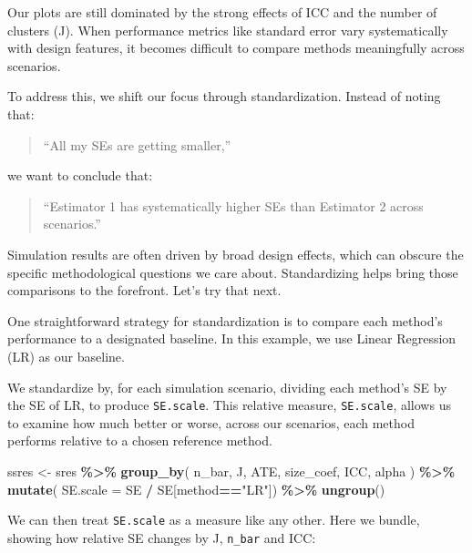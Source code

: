 \documentclass[
]{book}
\newenvironment{Shaded}{\begin{snugshade}}{\end{snugshade}}
\newcommand{\AttributeTok}[1]{\textcolor[rgb]{0.13,0.29,0.53}{#1}}
\newcommand{\FunctionTok}[1]{\textcolor[rgb]{0.13,0.29,0.53}{\textbf{#1}}}
\newcommand{\NormalTok}[1]{#1}
\newcommand{\OtherTok}[1]{\textcolor[rgb]{0.56,0.35,0.01}{#1}}
\newcommand{\SpecialCharTok}[1]{\textcolor[rgb]{0.81,0.36,0.00}{\textbf{#1}}}
\newcommand{\StringTok}[1]{\textcolor[rgb]{0.31,0.60,0.02}{#1}}
\begin{document}
Our plots are still dominated by the strong effects of ICC and the number of clusters (J). When performance metrics like standard error vary systematically with design features, it becomes difficult to compare methods meaningfully across scenarios.

To address this, we shift our focus through standardization. Instead of noting that:

\begin{quote}
``All my SEs are getting smaller,''
\end{quote}

we want to conclude that:

\begin{quote}
``Estimator 1 has systematically higher SEs than Estimator 2 across scenarios.''
\end{quote}

Simulation results are often driven by broad design effects, which can obscure the specific methodological questions we care about. Standardizing helps bring those comparisons to the forefront.
Let's try that next.

One straightforward strategy for standardization is to compare each method's performance to a designated baseline. In this example, we use Linear Regression (LR) as our baseline.

We standardize by, for each simulation scenario, dividing each method's SE by the SE of LR, to produce \texttt{SE.scale}.
This relative measure, \texttt{SE.scale}, allows us to examine how much better or worse, across our scenarios, each method performs relative to a chosen reference method.

\begin{Shaded}
\begin{Highlighting}[]
\NormalTok{ssres }\OtherTok{\textless{}{-}} 
\NormalTok{  sres }\SpecialCharTok{\%\textgreater{}\%} 
  \FunctionTok{group\_by}\NormalTok{( n\_bar, J, ATE, size\_coef, ICC, alpha ) }\SpecialCharTok{\%\textgreater{}\%}
  \FunctionTok{mutate}\NormalTok{( }\AttributeTok{SE.scale =}\NormalTok{ SE }\SpecialCharTok{/}\NormalTok{ SE[method}\SpecialCharTok{==}\StringTok{"LR"}\NormalTok{]) }\SpecialCharTok{\%\textgreater{}\%}
  \FunctionTok{ungroup}\NormalTok{()}
\end{Highlighting}
\end{Shaded}

We can then treat \texttt{SE.scale} as a measure like any other.
Here we bundle, showing how relative SE changes by J, \texttt{n\_bar} and ICC:
\end{document}
